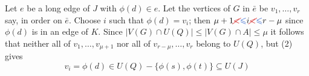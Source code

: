 Let $e$ be a long edge of $J$ with $\phi(d) \in e$. Let the vertices of $G$ in $\bar{e}$ be $v_1, \dots, v_r$ say, in order on $\bar{e}$. Choose $i$ such that $\phi(d) = v_i$; then $\mu + 1 \delm{<}\fix{\le} i \delm{<}\fix{\le} r - \mu$ since $\phi(d)$ is in an edge of $K$. Since $|V(G) \cap U(Q)| \le |V(G) \cap A| \le \mu$ it follows that neither all of $v_1, \dots, v_{\mu + 1}$ nor all of $v_{r - \mu}, \dots, v_r$ belong to $U(Q)$, but (2) gives
\begin{equation*}
v_i = \phi(d) \in U(Q) - \{\phi(s), \phi(t)\} \subseteq U(J)
\end{equation*}
